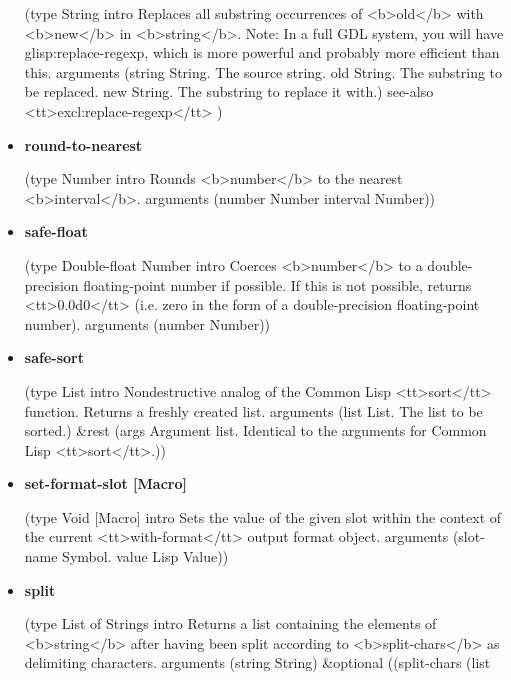 \documentclass [11pt]{book}
\begin{document}
\begin{itemize}
(type String intro
  Replaces all substring occurrences of <b>old</b> with <b>new</b>
in <b>string</b>.
Note: In a full GDL system, you will have glisp:replace-regexp, which
is more powerful and probably more efficient than this.
 arguments
 (string String. The source string. old
         String. The substring to be replaced. new
         String. The substring to replace it with.)
 see-also <tt>excl:replace-regexp</tt> 
)



\item {}
\label{prim:round-to-nearest}
\textbf{round-to-nearest}

(type Number intro  Rounds <b>number</b> to the nearest <b>interval</b>.
 arguments (number Number interval Number))



\item {}
\label{prim:safe-float}
\textbf{safe-float}

(type Double-float Number intro
  Coerces <b>number</b> to a double-precision floating-point
number if possible. If this is not possible, returns <tt>0.0d0</tt> (i.e. zero in the form
of a double-precision floating-point number).
 arguments (number Number))



\item {}
\label{prim:safe-sort}
\textbf{safe-sort}

(type List intro
  Nondestructive analog of the Common Lisp <tt>sort</tt> function.
Returns a freshly created list.
 arguments (list List. The list to be sorted.) \&rest
 (args
  Argument list. Identical to the arguments for Common Lisp <tt>sort</tt>.))



\item {}
\label{prim:set-format-slot}
\textbf{set-format-slot [Macro]}

(type Void [Macro] intro
  Sets the value of the given slot within the context of the current
<tt>with-format</tt> output format object.
 arguments (slot-name Symbol. value Lisp Value))



\item {}
\label{prim:split}
\textbf{split}

(type List of Strings intro
  Returns a list containing the elements of <b>string</b> after having
been split according to <b>split-chars</b> as delimiting characters.
 arguments (string String) \&optional
 ((split-chars
   (list   
 

\end{itemize}
\end{document}
